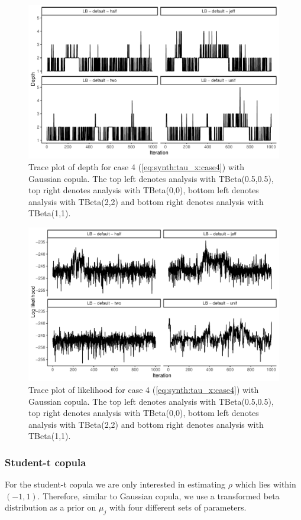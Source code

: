 \documentclass{amsart}
\begin{document}
\begin{figure}
	\centering
	\includegraphics[width = 0.75\linewidth]{trace_case4_gauss_depth.pdf}
	\caption{Trace plot of depth for case 4 (\cref{eq:synth:tau_x:case4}) with Gaussian copula. The top left denotes analysis with TBeta(0.5,0.5), top right denotes analysis with TBeta(0,0), bottom left denotes analysis with TBeta(2,2) and bottom right denotes analysis with TBeta(1,1).}
	\label{fig:case4:gauss:depth}
\end{figure}

\begin{figure}
	\centering
	\includegraphics[width = 0.75\linewidth]{trace_case4_gauss_like.pdf}
	\caption{Trace plot of likelihood for case 4 (\cref{eq:synth:tau_x:case4}) with Gaussian copula. The top left denotes analysis with TBeta(0.5,0.5), top right denotes analysis with TBeta(0,0), bottom left denotes analysis with TBeta(2,2) and bottom right denotes analysis with TBeta(1,1).}
	\label{fig:case4:gauss:like}
\end{figure}

\subsubsection{Student-t copula} For the student-t copula we are only interested in estimating $\rho$ which lies within $(-1,1)$. Therefore, similar to Gaussian copula, we use a transformed beta distribution as a prior on $\mu_j$ with four different sets of parameters.
\end{document}
